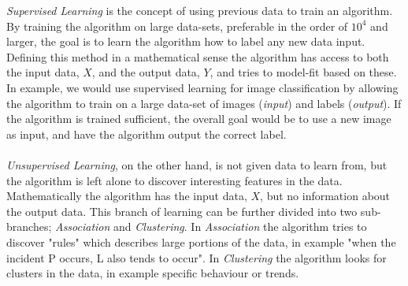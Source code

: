 \textit{Supervised Learning} is the concept of using previous data to train an algorithm. By training the algorithm on large data-sets, preferable in the order of $10^{4}$ and larger, the goal is to learn the algorithm how to label any new data input. Defining this method in a mathematical sense the algorithm has access to both the input data, $X$, and the output data, $Y$, and tries to model-fit based on these. In example, we would use supervised learning for image classification by allowing the algorithm to train on a large data-set of images (\textit{input}) and labels (\textit{output}). If the algorithm is trained sufficient, the overall goal would be to use a new image as input, and have the algorithm output the correct label.\\\\
\textit{Unsupervised Learning}, on the other hand, is not given data to learn from, but the algorithm is left alone to discover interesting features in the data. Mathematically the algorithm has the input data, $X$, but no information about the output data. This branch of learning can be further divided into two sub-branches; \textit{Association} and \textit{Clustering}. In \textit{Association} the algorithm tries to discover "rules" which describes large portions of the data, in example "when the incident P occurs, L also tends to occur". In \textit{Clustering} the algorithm looks for clusters in the data, in example specific behaviour or trends. 

